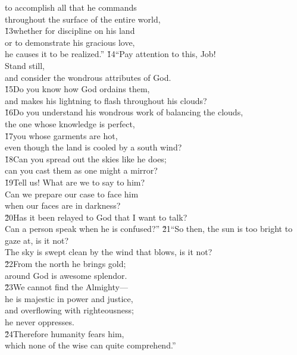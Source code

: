 \begin{poetry}
\poemll    to accomplish all that he commands \\
\poemlll       throughout the surface of the entire world, \\
\poeml \v{13}whether for discipline on his land \\
\poemll    or to demonstrate his gracious love, \\
\poemlll       he causes it to be realized.''
\poeml \v{14}``Pay attention to this, Job! \\
\poemll    Stand still, \\
\poemlll       and consider the wondrous attributes of God. \\
\poeml \v{15}Do you know how God ordains them, \\
\poemll    and makes his lightning to flash throughout his clouds? \\
\poeml \v{16}Do you understand his wondrous work of balancing the clouds, \\
\poemll    the one whose knowledge is perfect, \\
\poeml \v{17}you whose garments are hot, \\
\poemll    even though the land is cooled by a south wind? \\
\poeml \v{18}Can you spread out the skies like he does; \\
\poemll    can you cast them as one might a mirror? \\
\poeml \v{19}Tell us! What are we to say to him? \\
\poemll    Can we prepare our case to face him \\
\poemlll       when our faces are in darkness? \\
\poeml \v{20}Has it been relayed to God that I want to talk? \\
\poemll    Can a person speak when he is confused?''
\poeml \v{21}``So then, the sun is too bright to gaze at, is it not? \\
\poemll    The sky is swept clean by the wind that blows, is it not? \\
\poeml \v{22}From the north he brings gold; \\
\poemll    around God is awesome splendor. \\
\poeml \v{23}We cannot find the Almighty--- \\
\poemll    he is majestic in power and justice, \\
\poeml and overflowing with righteousness; \\
\poemll    he never oppresses. \\
\poeml \v{24}Therefore humanity fears him, \\
\poemll    which none of the wise can quite comprehend.''
\end{poetry}


